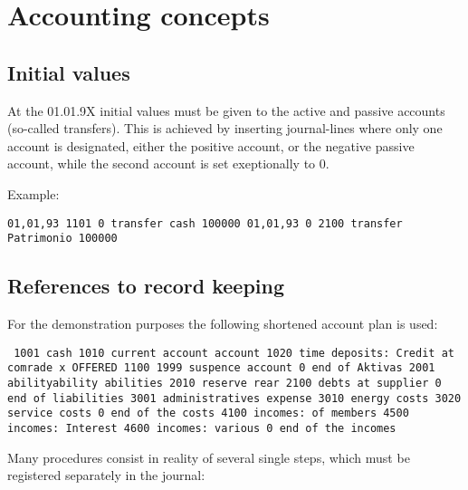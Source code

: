 \chapter{Accounting concepts}

\section{ Initial values}

 At the 01.01.9X initial values must be given to the active and passive
accounts (so-called transfers).  This is achieved by inserting journal-lines where only one account is designated, either the positive account, or
the negative passive account, while the second account is set exeptionally to 0.

 Example:

 {\tt  01,01,93 1101 0 transfer cash 100000 01,01,93 0 2100 transfer
Patrimonio 100000 }



\section{ References to record keeping}

 For the demonstration purposes the following shortened account plan is used:

{\tt  
1001 cash 
1010 current account account 
1020 time deposits:  Credit at
comrade x OFFERED 
1100 
1999 suspence account 
0 end of Aktivas 
2001
abilityability abilities 
2010 reserve rear 2100 debts at supplier 0 end of
liabilities 3001 administratives expense 3010 energy costs 3020 service costs 0
end of the costs 4100 incomes:  of members 4500 incomes:  Interest 4600
incomes:  various 0 end of the incomes }

 Many procedures consist in reality of several single steps, which must be
registered separately in the journal:



